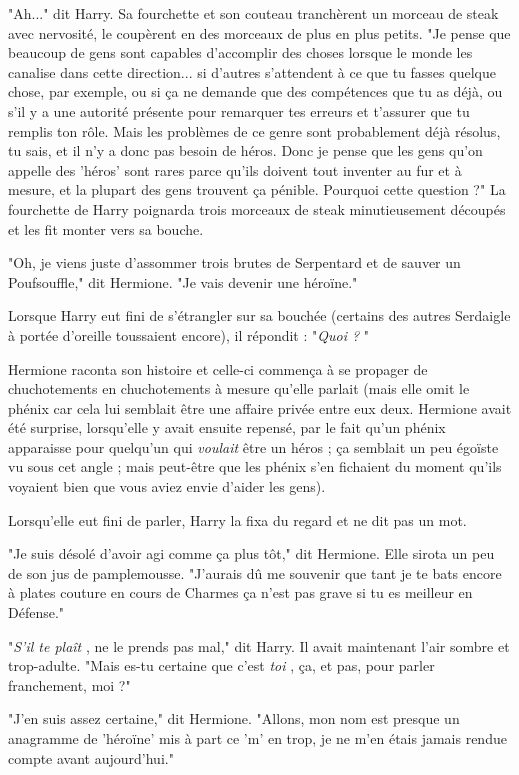 "Ah..." dit Harry. Sa fourchette et son couteau tranchèrent un morceau de steak avec nervosité, le coupèrent en des morceaux de plus en plus petits. "Je pense que beaucoup de gens sont capables d'accomplir des choses lorsque le monde les canalise dans cette direction... si d'autres s'attendent à ce que tu fasses quelque chose, par exemple, ou si ça ne demande que des compétences que tu as déjà, ou s'il y a une autorité présente pour remarquer tes erreurs et t'assurer que tu remplis ton rôle. Mais les problèmes de ce genre sont probablement déjà résolus, tu sais, et il n'y a donc pas besoin de héros. Donc je pense que les gens qu'on appelle des 'héros' sont rares parce qu'ils doivent tout inventer au fur et à mesure, et la plupart des gens trouvent ça pénible. Pourquoi cette question ?" La fourchette de Harry poignarda trois morceaux de steak minutieusement découpés et les fit monter vers sa bouche.

"Oh, je viens juste d'assommer trois brutes de Serpentard et de sauver un Poufsouffle," dit Hermione. "Je vais devenir une héroïne."

Lorsque Harry eut fini de s'étrangler sur sa bouchée (certains des autres Serdaigle à portée d'oreille toussaient encore), il répondit : "\emph{Quoi ?} "

Hermione raconta son histoire et celle-ci commença à se propager de chuchotements en chuchotements à mesure qu'elle parlait (mais elle omit le phénix car cela lui semblait être une affaire privée entre eux deux. Hermione avait été surprise, lorsqu'elle y avait ensuite repensé, par le fait qu'un phénix apparaisse pour quelqu'un qui \emph{voulait}  être un héros ; ça semblait un peu égoïste vu sous cet angle ; mais peut-être que les phénix s'en fichaient du moment qu'ils voyaient bien que vous aviez envie d'aider les gens).

Lorsqu'elle eut fini de parler, Harry la fixa du regard et ne dit pas un mot.

"Je suis désolé d'avoir agi comme ça plus tôt," dit Hermione. Elle sirota un peu de son jus de pamplemousse. "J'aurais dû me souvenir que tant je te bats encore à plates couture en cours de Charmes ça n'est pas grave si tu es meilleur en Défense."

"\emph{S'il te plaît} , ne le prends pas mal," dit Harry. Il avait maintenant l'air sombre et trop-adulte. "Mais es-tu certaine que c'est \emph{toi} , ça, et pas, pour parler franchement, moi ?"

"J'en suis assez certaine," dit Hermione. "Allons, mon nom est presque un anagramme de 'héroïne' mis à part ce 'm' en trop, je ne m'en étais jamais rendue compte avant aujourd'hui."

